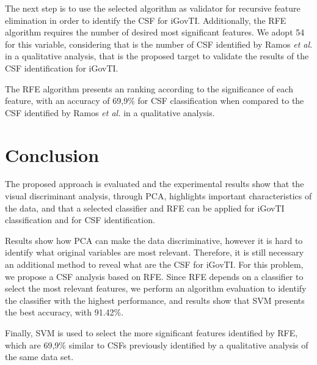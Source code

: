 The next step is to use the selected algorithm as validator for recursive feature elimination in order to identify the CSF for iGovTI. Additionally, the RFE algorithm requires the number of desired most significant features. We adopt 54 for this variable, considering that is the number of CSF identified by Ramos \emph{et al.}  in a qualitative analysis, that is the proposed target to validate the results of the CSF identification for iGovTI.

The RFE algorithm presents an ranking according to the significance of each feature, with an accuracy of 69,9\% for CSF classification when compared to the CSF identified by Ramos \emph{et al.}  in a qualitative analysis.


\section{Conclusion}
\label{sec:b_conclusion}

The proposed approach is evaluated and the experimental results show that the visual discriminant analysis, through PCA, highlights important characteristics of the data, and that a selected classifier and RFE can be applied for iGovTI classification and for CSF identification. 

Results show how PCA can make the data discriminative, however it is hard to identify what original variables are most relevant. Therefore, it is still necessary an additional method to reveal what are the CSF for iGovTI. For this problem, we propose a CSF analysis based on RFE. Since RFE depends on a classifier to select the most relevant features, we perform an algorithm evaluation to identify the classifier with the highest performance, and results show that SVM \cite{hearst1998support} presents the best accuracy, with 91.42\%. 

Finally, SVM is used to select the more significant features identified by RFE, which are 69,9\% similar to CSFs previously identified by a qualitative analysis of the same data set.
